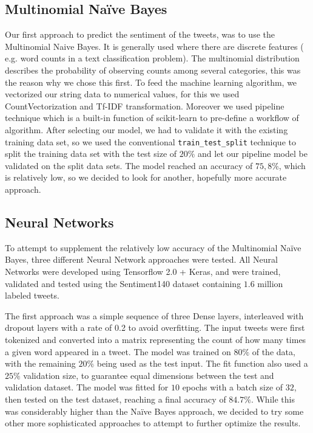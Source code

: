 \documentclass{article}
\begin{document}
  \subsection{Multinomial Naïve Bayes}
  Our first approach to predict the sentiment of the tweets, was to
  use the Multinomial Naive Bayes. It is generally used where there
  are discrete features ( e.g. word counts in a text classification
  problem). The multinomial distribution describes the probability of
  observing counts among several categories, this was the reason why
  we chose this first. To feed the machine learning algorithm, we
  vectorized our string data to numerical values, for this  we used
  CountVectorization and Tf-IDF transformation. Moreover we used
  pipeline technique which is a built-in function of scikit-learn to
  pre-define a workflow of algorithm. After selecting our model, we
  had to validate it with the existing training data set, so we used
  the conventional \texttt{train\_test\_split} technique to split the
  training data set with the test size of $20\%$ and let our pipeline
  model be validated on the split data sets. The model reached an
  accuracy of $75,8\%$, which is relatively low, so we decided to look
  for another, hopefully more accurate approach. 
  
  \subsection{Neural Networks}
  \begin{wrapfigure}{r}{0.30\linewidth}
    \texttt{[image: \{Dense.png]}}
    \centering
    \captionsetup{justification=centering}
    \caption{Diagram of densely layered Neural Network}
    \vspace{-110pt}
    \label{fig:dense}
  \end{wrapfigure}
  
  To attempt to supplement the relatively low accuracy of the
  Multinomial Naïve Bayes, three different Neural Network approaches
  were tested. All Neural Networks were developed using Tensorflow 2.0
  + Keras, and were trained, validated and tested using the
  Sentiment140 dataset containing $1.6$ million labeled tweets.%
  
  The first approach was a simple sequence of three Dense layers,
  interleaved with dropout layers with a rate of 0.2 to avoid
  overfitting. The input tweets were first tokenized and converted
  into a matrix representing the count of how many times a given word
  appeared in a tweet. The model was trained on $80\%$ of the data,
  with the remaining $20\%$ being used as the test input. The fit
  function also used a $25\%$ validation size, to guarantee equal
  dimensions between the test and validation dataset. The model was
  fitted for $10$ epochs with a batch size of $32$, then tested on the
  test dataset, reaching a final accuracy of $84.7\%$. While this was
  considerably higher than the Naïve Bayes approach, we decided to try
  some other more sophisticated approaches to attempt to further
  optimize the results.%
\end{document}
